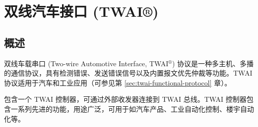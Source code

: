 \documentclass[main\_\_CN.tex]{subfiles}
\begin{document}

\ifglobal
\else
    {\let\clearpage\relax \listoftodos}
    \tableofcontents
\fi




\hypertarget{twai}{}
\chapter{双线汽车接口 (TWAI®)}
\label{mod:twai}
\section{概述}

双线车载串口 (Two-wire Automotive Interface, TWAI$^\circledR$) 协议是一种多主机、多播的通信协议，具有检测错误、发送错误信号以及内置报文优先仲裁等功能。TWAI 协议适用于汽车和工业应用（可参见第 \ref{sec:twai-functional-protocol} 章）。

\chipname{} 包含一个 TWAI 控制器，可通过外部收发器连接到 TWAI 总线。TWAI 控制器包含一系列先进的功能，用途广泛，可用于如汽车产品、工业自动化控制、楼宇自动化等。
\end{document}
